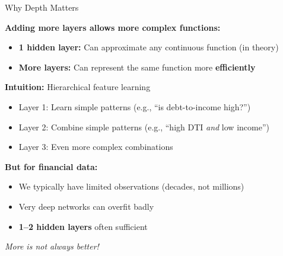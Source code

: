 \documentclass[10pt]{beamer}
\newcommand{\highlight}[1]{\textcolor{AccentOrange}{\textbf{#1}}}
\begin{document}
\begin{frame}{Why Depth Matters}

  \textbf{Adding more layers allows more complex functions:}

  \vspace{0.5em}
  \begin{itemize}
    \item \textbf{1 hidden layer:} Can approximate any continuous function (in theory)
    \item \textbf{More layers:} Can represent the same function more \highlight{efficiently}
  \end{itemize}

  \vspace{1em}
  \textbf{Intuition:} Hierarchical feature learning
  \begin{itemize}
    \item Layer 1: Learn simple patterns (e.g., ``is debt-to-income high?'')
    \item Layer 2: Combine simple patterns (e.g., ``high DTI \textit{and} low income'')
    \item Layer 3: Even more complex combinations
  \end{itemize}

  \vspace{1em}
  \textbf{But for financial data:}
  \begin{itemize}
    \item We typically have limited observations (decades, not millions)
    \item Very deep networks can overfit badly
    \item \highlight{1--2 hidden layers} often sufficient
  \end{itemize}

  \vspace{0.3em}
  \textit{More is not always better!}
\end{frame}

\end{document}
